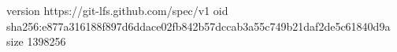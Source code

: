 version https://git-lfs.github.com/spec/v1
oid sha256:e877a316188f897d6ddace02fb842b57dccab3a55c749b21daf2de5c61840d9a
size 1398256
